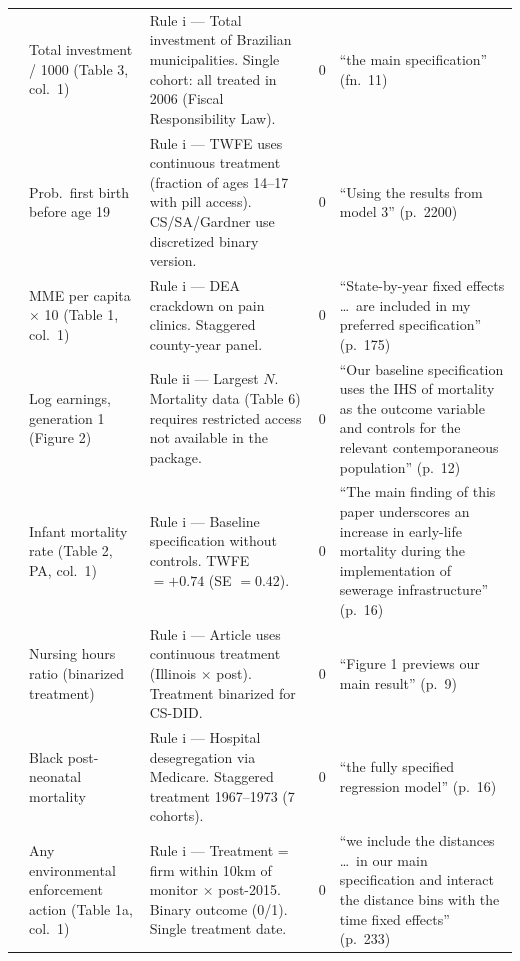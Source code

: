 \begin{small}
\begin{longtable}{p{2.2cm} p{3.0cm} p{5.5cm} p{0.8cm} p{4cm}}
\textcite{kresch2020buck}
& Total investment / 1000 (Table 3, col.~1)
& Rule i --- Total investment of Brazilian municipalities. Single cohort: all treated in 2006 (Fiscal Responsibility Law).
& 0
& ``the main specification'' (fn.~11) \\

\textcite{myers2017power}
& Prob.\ first birth before age 19
& Rule i --- TWFE uses continuous treatment (fraction of ages 14--17 with pill access). CS/SA/Gardner use discretized binary version.
& 0
& ``Using the results from model 3'' (p.~2200) \\

\textcite{soliman2025disrupting}
& MME per capita $\times$ 10 (Table 1, col.~1)
& Rule i --- DEA crackdown on pain clinics. Staggered county-year panel.
& 0
& ``State-by-year fixed effects \ldots\ are included in my preferred specification'' (p.~175) \\

\textcite{moorthy2025bluecollar}
& Log earnings, generation 1 (Figure 2)
& Rule ii --- Largest $N$. Mortality data (Table 6) requires restricted access not available in the package.
& 0
& ``Our baseline specification uses the IHS of mortality as the outcome variable and controls for the relevant contemporaneous population'' (p.~12) \\

\textcite{bancalari2024unintended}
& Infant mortality rate (Table 2, PA, col.~1)
& Rule i --- Baseline specification without controls. TWFE $= +0.74$ (SE $= 0.42$).
& 0
& ``The main finding of this paper underscores an increase in early-life mortality during the implementation of sewerage infrastructure'' (p.~16) \\

\textcite{gandhi2025alleviating}
& Nursing hours ratio (binarized treatment)
& Rule i --- Article uses continuous treatment (Illinois $\times$ post). Treatment binarized for CS-DID.
& 0
& ``Figure 1 previews our main result'' (p.~9) \\

\textcite{anderson2024imposing}
& Black post-neonatal mortality
& Rule i --- Hospital desegregation via Medicare. Staggered treatment 1967--1973 (7 cohorts).
& 0
& ``the fully specified regression model'' (p.~16) \\

\textcite{axbard2024informed}
& Any environmental enforcement action (Table 1a, col.~1)
& Rule i --- Treatment = firm within 10km of monitor $\times$ post-2015. Binary outcome (0/1). Single treatment date.
& 0
& ``we include the distances \ldots\ in our main specification and interact the distance bins with the time fixed effects'' (p.~233) \\


\end{longtable}
\end{small}
